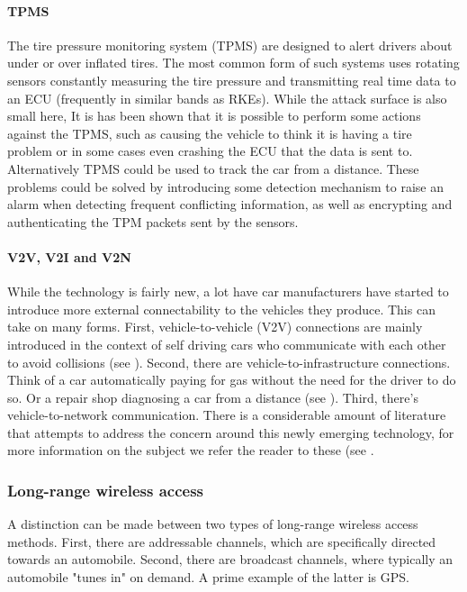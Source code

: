 \documentclass[master=cws,masteroption=vs,english]{kulemt}
\begin{document}
\paragraph{TPMS} The tire pressure monitoring system (TPMS) are designed to alert drivers about under or over inflated tires. The most common form of such systems uses rotating sensors constantly measuring the tire pressure and transmitting real time data to an ECU (frequently in similar bands as RKEs)\cite{Kosher}. While the attack surface is also small here, It is has been shown that it is possible to perform some actions against the TPMS, such as causing the vehicle to think it is having a tire problem\cite{TPMS} or in some cases even crashing the ECU that the data is sent to\cite{MillerA}. Alternatively TPMS could be used to track the car from a distance\cite{TPMS}. These problems could be solved by introducing some detection mechanism to raise an alarm when detecting frequent conflicting information, as well as encrypting and authenticating the TPM packets sent by the sensors\cite{TPMS}.

\paragraph{V2V, V2I and V2N} While the technology is fairly new, a lot have car manufacturers have started to introduce more external connectability to the vehicles they produce. This can take on many forms\cite{Ahmed}. First, vehicle-to-vehicle (V2V) connections are mainly introduced in the context of self driving cars who communicate with each other to avoid collisions (see \cite{Enisa}). Second, there are vehicle-to-infrastructure connections. Think of a car automatically paying for gas without the need for the driver to do so. Or a repair shop diagnosing a car from a distance (see \cite{Kleberger}). Third, there's vehicle-to-network communication. There is a considerable amount of literature that attempts to address the concern around this newly emerging technology, for more information on the subject we refer the reader to these (see \cite{Kleberger15}\cite{Russel17}\cite{Maxim}\cite{Crispo}.

\subsubsection{Long-range wireless access}

A distinction can be made between two types of long-range wireless access methods. First, there are addressable channels, which are specifically directed towards an automobile. Second, there are broadcast channels, where typically an automobile "tunes in" on demand. A prime example of the latter is GPS.
\end{document}
